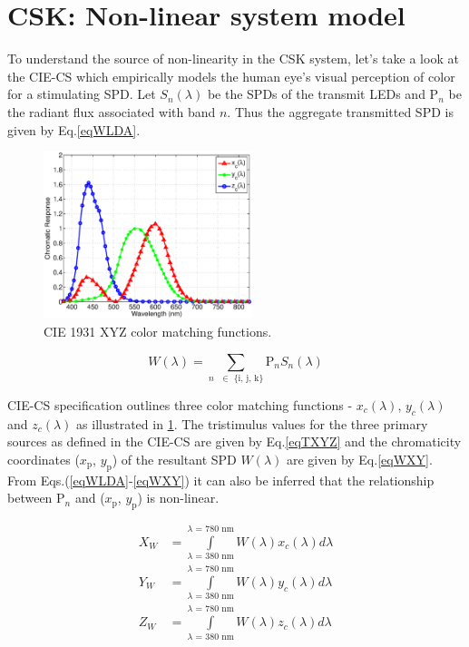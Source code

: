 \documentclass[10pt,letterpaper]{article}
\begin{document}
\section{CSK: Non-linear system model}\label{sCSKNL}

To understand the source of non-linearity in the CSK system, let's take a look at the CIE-CS which empirically models the human eye's visual perception of color for a stimulating SPD. Let $S_{n}(\lambda)$ be the SPDs of the transmit LEDs and P$_{n}$ be the radiant flux associated with band $n$. Thus the aggregate transmitted SPD is given by Eq.\eqref{eqWLDA}.

\begin{figure}[b]
	\centering
		\includegraphics[trim={0.05in 0.05in 0.05in 0.05in}, clip=true, width=2.4in]{CIE1931CMF.eps}
	\caption{CIE 1931 XYZ color matching functions.}
	\label{figCIEXYZ}
\end{figure}

\begin{equation}
	W(\lambda) = \sum\limits_{n\text{ }\in\text{ \{i, j, k\}}}\text{P}_{n}S_{n}(\lambda)
	\label{eqWLDA}
\end{equation}

CIE-CS specification outlines three color matching functions - $x_{c}(\lambda)$, $y_{c}(\lambda)$ and $z_{c}(\lambda)$ as illustrated in \figurename{ }\ref{figCIEXYZ}. The tristimulus values for the three primary sources as defined in the CIE-CS are given by Eq.\eqref{eqTXYZ} and the chromaticity coordinates ($x_{\text{p}}$, $y_{\text{p}}$) of the resultant SPD $W(\lambda)$ are given by Eq.\eqref{eqWXY}. From Eqs.(\ref{eqWLDA}-\ref{eqWXY}) it can also be inferred that the relationship between P$_{n}$ and ($x_{\text{p}}$, $y_{\text{p}}$) is non-linear.

\begin{equation}
	\begin{aligned}
		X_{W} &= \int\limits_{\lambda\text{ = 380 nm}}^{\lambda\text{ = 780 nm}}W(\lambda)x_{c}(\lambda)d\lambda\\
		Y_{W} &= \int\limits_{\lambda\text{ = 380 nm}}^{\lambda\text{ = 780 nm}}W(\lambda)y_{c}(\lambda)d\lambda\\
		Z_{W} &= \int\limits_{\lambda\text{ = 380 nm}}^{\lambda\text{ = 780 nm}}W(\lambda)z_{c}(\lambda)d\lambda
	\end{aligned}
	\label{eqTXYZ}
\end{equation}
\end{document}
